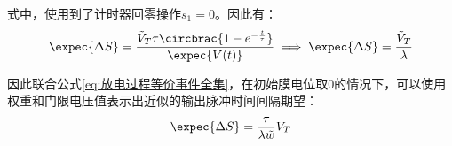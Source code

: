 \documentclass[11pt]{article}
\begin{document}
式中，使用到了计时器回零操作$s_1=0$。因此有：
\begin{align}
  \expec{\Delta S} =\frac{\tilde{V}_T\tau\circbrac{1-e^{-\frac{t}{\tau}}}}{\expec{V(t)}}\implies \expec{\Delta S}=\frac{\tilde{V}_T}{\lambda}
\end{align}\par
因此联合公式\ref{eq:放电过程等价事件全集}，在初始膜电位取0的情况下，可以使用权重和门限电压值表示出近似的输出脉冲时间间隔期望：
\begin{align}
  \expec{\Delta S}=\frac{\tau}{\lambda\tilde{w}}V_T
  \label{eq:近似的输出脉冲时间间隔期望值}
\end{align}\par
\newpage
\printbibliography[heading=bibliography,title=参考文献]
\end{document}
